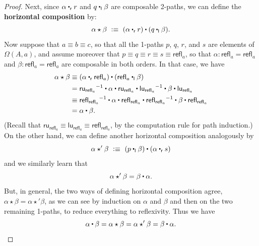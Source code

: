 \documentclass[10pt,a4paper]{article}
\providecommand{\index}[1]{}
\newcommand{\jdeq}{\equiv}      %
\newcommand{\defeq}{\vcentcolon\equiv}  %
\newcommand{\define}[1]{\textbf{#1}}
\newcommand{\leftwhisker}{\mathbin{{\ct}_{\mathsf{l}}}}  %
\newcommand{\rightwhisker}{\mathbin{{\ct}_{\mathsf{r}}}} %
\newcommand{\hct}{\star}
\newcommand{\refl}[1]{\ensuremath{\mathsf{refl}_{#1}}\xspace}
\newcommand{\ct}{%
  \mathchoice{\mathbin{\raisebox{0.5ex}{$\displaystyle\centerdot$}}}%
             {\mathbin{\raisebox{0.5ex}{$\centerdot$}}}%
             {\mathbin{\raisebox{0.25ex}{$\scriptstyle\,\centerdot\,$}}}%
             {\mathbin{\raisebox{0.1ex}{$\scriptscriptstyle\,\centerdot\,$}}}
}
\newcommand{\opp}[1]{\mathord{{#1}^{-1}}}
\theoremstyle{definition}
\theoremstyle{remark}
\numberwithin{equation}{section}
\newcommand{\indexdef}[1]{\index{#1|defstyle}}   %
\begin{document}
\begin{proof}
Next, since $\alpha \rightwhisker r$ and $q\leftwhisker \beta$ are composable 2-paths, we can define the \define{horizontal composition}
\indexdef{horizontal composition!of paths}%
\indexdef{composition!of paths!horizontal}%
by:
\[
\alpha\hct\beta\ \defeq\ (\alpha\rightwhisker r) \ct (q\leftwhisker \beta).
\]
Now suppose that $a \jdeq  b \jdeq  c$, so that all the 1-paths $p$, $q$, $r$, and $s$ are elements of $\Omega(A,a)$, and assume moreover that $p\jdeq q \jdeq r \jdeq s\jdeq \refl{a}$, so that $\alpha:\refl{a} = \refl{a}$ and $\beta:\refl{a} = \refl{a}$ are composable in both orders.
In that case, we have
\begin{align*}
  \alpha\hct\beta
  &\jdeq (\alpha\rightwhisker\refl{a}) \ct (\refl{a}\leftwhisker \beta)\\
  &= \opp{\mathsf{ru}_{\refl{a}}} \ct \alpha \ct \mathsf{ru}_{\refl{a}} \ct \opp{\mathsf{lu}_{\refl a}} \ct \beta \ct \mathsf{lu}_{\refl{a}}\\
  &\jdeq \opp{\refl{\refl{a}}} \ct \alpha \ct \refl{\refl{a}} \ct \opp{\refl{\refl a}} \ct \beta \ct \refl{\refl{a}}\\
  &= \alpha \ct \beta.
\end{align*}
(Recall that $\mathsf{ru}_{\refl{a}} \jdeq \mathsf{lu}_{\refl{a}} \jdeq \refl{\refl{a}}$, by the computation rule for path induction.)
On the other hand, we can define another horizontal composition analogously by
\[
\alpha\hct'\beta\ \defeq\ (p\leftwhisker \beta)\ct (\alpha\rightwhisker s)
\]
and we similarly learn that
\[
\alpha\hct'\beta = \beta\ct\alpha.
\]
\index{interchange law}%
But, in general, the two ways of defining horizontal composition agree, $\alpha\hct\beta = \alpha\hct'\beta$, as we can see by induction on $\alpha$ and $\beta$ and then on the two remaining 1-paths, to reduce everything to reflexivity.
Thus we have
\[\alpha \ct \beta = \alpha\hct\beta = \alpha\hct'\beta = \beta\ct\alpha.
\qedhere
\]
\end{proof}
\end{document}
